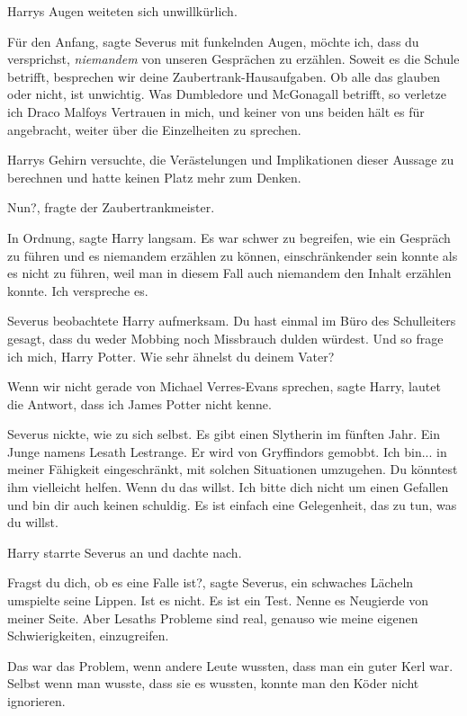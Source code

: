 Harrys Augen weiteten sich unwillkürlich.

\glqq{}Für den Anfang\grqq{}, sagte Severus mit funkelnden Augen, \glqq{}möchte
ich, dass du versprichst, \emph{niemandem} von unseren Gesprächen zu erzählen.
Soweit es die Schule betrifft, besprechen wir deine Zaubertrank-Hausaufgaben. Ob
alle das glauben oder nicht, ist unwichtig. Was Dumbledore und McGonagall
betrifft, so verletze ich Draco Malfoys Vertrauen in mich, und keiner von uns
beiden hält es für angebracht, weiter über die Einzelheiten zu sprechen.\grqq{}

Harrys Gehirn versuchte, die Verästelungen und Implikationen dieser Aussage zu
berechnen und hatte keinen Platz mehr zum Denken.

\glqq{}Nun?\grqq{}, fragte der Zaubertrankmeister.

\glqq{}In Ordnung\grqq{}, sagte Harry langsam. Es war schwer zu begreifen, wie
ein Gespräch zu führen und es niemandem erzählen zu können, einschränkender sein
konnte als es nicht zu führen, weil man in diesem Fall auch niemandem den Inhalt
erzählen konnte. \glqq{}Ich verspreche es.\grqq{}

Severus beobachtete Harry aufmerksam. \glqq{}Du hast einmal im Büro des
Schulleiters gesagt, dass du weder Mobbing noch Missbrauch dulden würdest. Und
so frage ich mich, Harry Potter. Wie sehr ähnelst du deinem Vater?\grqq{}

\glqq{}Wenn wir nicht gerade von Michael Verres-Evans sprechen\grqq{}, sagte
Harry, \glqq{}lautet die Antwort, dass ich James Potter nicht kenne.\grqq{}

Severus nickte, wie zu sich selbst. \glqq{}Es gibt einen Slytherin im fünften
Jahr. Ein Junge namens Lesath Lestrange. Er wird von Gryffindors gemobbt. Ich
bin... in meiner Fähigkeit eingeschränkt, mit solchen Situationen umzugehen. Du
könntest ihm vielleicht helfen. Wenn du das willst. Ich bitte dich nicht um
einen Gefallen und bin dir auch keinen schuldig. Es ist einfach eine
Gelegenheit, das zu tun, was du willst.\grqq{}

Harry starrte Severus an und dachte nach.

\glqq{}Fragst du dich, ob es eine Falle ist?\grqq{}, sagte Severus, ein
schwaches Lächeln umspielte seine Lippen. \glqq{}Ist es nicht. Es ist ein Test.
Nenne es Neugierde von meiner Seite. Aber Lesaths Probleme sind real, genauso
wie meine eigenen Schwierigkeiten, einzugreifen.\grqq{}

Das war das Problem, wenn andere Leute wussten, dass man ein guter Kerl war.
Selbst wenn man wusste, dass sie es wussten, konnte man den Köder nicht
ignorieren.

